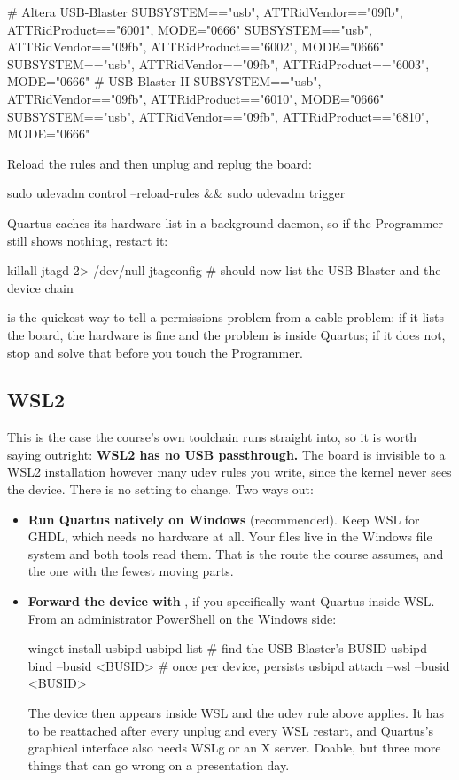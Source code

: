 \begin{console}
# Altera USB-Blaster
SUBSYSTEM=="usb", ATTR{idVendor}=="09fb", ATTR{idProduct}=="6001", MODE="0666"
SUBSYSTEM=="usb", ATTR{idVendor}=="09fb", ATTR{idProduct}=="6002", MODE="0666"
SUBSYSTEM=="usb", ATTR{idVendor}=="09fb", ATTR{idProduct}=="6003", MODE="0666"
# USB-Blaster II
SUBSYSTEM=="usb", ATTR{idVendor}=="09fb", ATTR{idProduct}=="6010", MODE="0666"
SUBSYSTEM=="usb", ATTR{idVendor}=="09fb", ATTR{idProduct}=="6810", MODE="0666"
\end{console}

Reload the rules and then unplug and replug the board:

\begin{shell}
sudo udevadm control --reload-rules && sudo udevadm trigger
\end{shell}

Quartus caches its hardware list in a background daemon, so if the Programmer still shows nothing,
restart it:

\begin{shell}
killall jtagd 2> /dev/null
jtagconfig            # should now list the USB-Blaster and the device chain
\end{shell}

 is the quickest way to tell a permissions problem from a cable problem: if it lists
the board, the hardware is fine and the problem is inside Quartus; if it does not, stop and solve that
before you touch the Programmer.

\subsection*{WSL2}
This is the case the course's own toolchain runs straight into, so it is worth saying outright:
\textbf{WSL2 has no USB passthrough.} The board is invisible to a WSL2 installation however many udev
rules you write, since the kernel never sees the device. There is no setting to change. Two ways out:

\begin{itemize}
  \item \textbf{Run Quartus natively on Windows} (recommended). Keep WSL for GHDL, which needs no
    hardware at all. Your  files live in the Windows file system and both tools read them.
    That is the route the course assumes, and the one with the fewest moving parts.
  \item \textbf{Forward the device with }, if you specifically want Quartus inside
    WSL. From an administrator PowerShell on the Windows side:

\begin{console}
winget install usbipd
usbipd list                      # find the USB-Blaster's BUSID
usbipd bind   --busid <BUSID>    # once per device, persists
usbipd attach --wsl --busid <BUSID>
\end{console}

    The device then appears inside WSL and the udev rule above applies. It has to be reattached after
    every unplug and every WSL restart, and Quartus's graphical interface also needs WSLg or an X
    server. Doable, but three more things that can go wrong on a presentation day.
\end{itemize}
